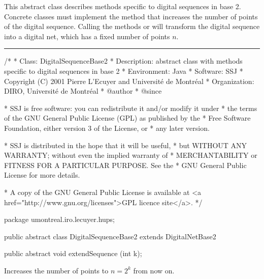 
This abstract class describes methods specific to digital sequences in base 2.
Concrete classes must implement the  method
that increases the number of points of the digital sequence.
Calling the  methods  or 
will transform the digital sequence into a digital net, which has
a fixed number of points $n$.


\bigskip\hrule\bigskip

\begin{code}
\begin{hide}
/*
 * Class:        DigitalSequenceBase2
 * Description:  abstract class with methods specific to digital sequences
                 in base 2
 * Environment:  Java
 * Software:     SSJ 
 * Copyright (C) 2001  Pierre L'Ecuyer and Université de Montréal
 * Organization: DIRO, Université de Montréal
 * @author       
 * @since

 * SSJ is free software: you can redistribute it and/or modify it under
 * the terms of the GNU General Public License (GPL) as published by the
 * Free Software Foundation, either version 3 of the License, or
 * any later version.

 * SSJ is distributed in the hope that it will be useful,
 * but WITHOUT ANY WARRANTY; without even the implied warranty of
 * MERCHANTABILITY or FITNESS FOR A PARTICULAR PURPOSE.  See the
 * GNU General Public License for more details.

 * A copy of the GNU General Public License is available at
   <a href="http://www.gnu.org/licenses">GPL licence site</a>.
 */
\end{hide}
package umontreal.iro.lecuyer.hups;


public abstract class DigitalSequenceBase2 extends DigitalNetBase2 \begin{hide} { 

\end{hide}

   public abstract void extendSequence (int k);
\end{code} 
\begin{tabb}
    Increases the number of points to $n = 2^k$ from now on.
\end{tabb}
\begin{htmlonly}
\end{htmlonly}
